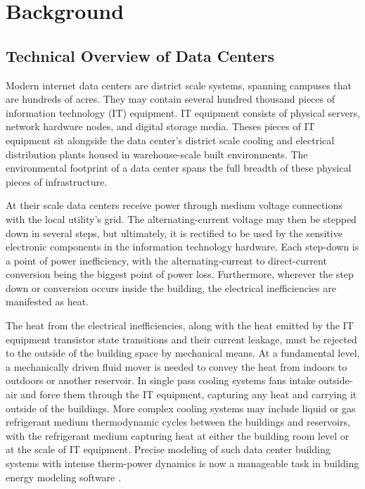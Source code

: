 \section{Background}
    \subsection{Technical Overview of Data Centers}
        Modern internet data centers are district scale systems, spanning campuses that are hundreds of acres. They may contain several hundred thousand pieces of information technology (IT) equipment. IT equipment consists of physical servers, network hardware nodes, and digital storage media. Theses pieces of IT equipment sit alongside the data center's district scale cooling and electrical distribution plants housed in warehouse-scale built environments. The environmental footprint of a data center spans the full breadth of these physical pieces of infrastructure. 

        At their scale data centers receive power through medium voltage connections with the local utility's grid. The alternating-current voltage may then be stepped down in several steps, but ultimately, it is rectified to be used by the sensitive electronic components in the information technology hardware. Each step-down is a point of power inefficiency, with the alternating-current to direct-current conversion being the biggest point of power loss. Furthermore, wherever the step down or conversion occurs inside the building, the electrical inefficiencies are manifested as heat.  

        The heat from the electrical inefficiencies, along with the heat emitted by the IT equipment transistor state transitions and their current leakage, must be rejected to the outside of the building space by mechanical means. At a fundamental level, a mechanically driven fluid mover is needed to convey the heat from indoors to outdoors or another reservoir. In single pass cooling systems fans intake outside-air and force them through the IT equipment, capturing any heat and carrying it outside of the buildings. More complex cooling systems may include liquid or gas refrigerant medium thermodynamic cycles between the buildings and reservoirs, with the refrigerant medium capturing heat at either the building room level or at the scale of IT equipment. Precise modeling of such data center building systems with intense therm-power dynamics is now a manageable task in building energy modeling software \cite{kumar20,kumar20b}. 

